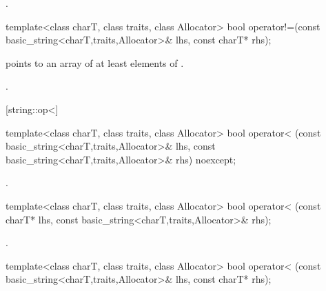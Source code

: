\begin{itemdescr}
\pnum
\returns
{}.
\end{itemdescr}

%
%
\begin{itemdecl}
template<class charT, class traits, class Allocator>
  bool operator!=(const basic_string<charT,traits,Allocator>& lhs,
                  const charT* rhs);
\end{itemdecl}

\begin{itemdescr}
\pnum
\requires {} points to an array of at least 
elements of .

\pnum
\returns
{}.
\end{itemdescr}

[string::op<]{}

%
%
\begin{itemdecl}
template<class charT, class traits, class Allocator>
  bool operator< (const basic_string<charT,traits,Allocator>& lhs,
                  const basic_string<charT,traits,Allocator>& rhs) noexcept;
\end{itemdecl}

\begin{itemdescr}
\pnum
\returns
{}.
\end{itemdescr}

%
%
\begin{itemdecl}
template<class charT, class traits, class Allocator>
  bool operator< (const charT* lhs,
                  const basic_string<charT,traits,Allocator>& rhs);
\end{itemdecl}

\begin{itemdescr}
\pnum
\returns
{}.
\end{itemdescr}

%
%
\begin{itemdecl}
template<class charT, class traits, class Allocator>
  bool operator< (const basic_string<charT,traits,Allocator>& lhs,
                  const charT* rhs);
\end{itemdecl}

